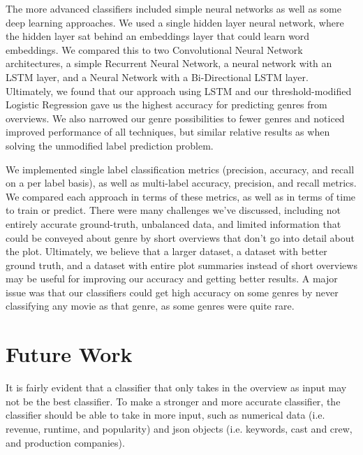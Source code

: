 \documentclass[sigconf]{acmart}
\begin{document}
The more advanced classifiers included simple neural networks as well as some deep learning approaches. We used a single hidden layer neural network, where the hidden layer sat behind an embeddings layer that could learn word embeddings.  We compared this to two Convolutional Neural Network architectures, a simple Recurrent Neural Network, a neural network with an LSTM layer, and a Neural Network with a Bi-Directional LSTM layer. Ultimately, we found that our approach using LSTM and our threshold-modified Logistic Regression gave us the highest accuracy for predicting genres from overviews. We also narrowed our genre possibilities to fewer genres and noticed improved performance of all techniques, but similar relative results as when solving the unmodified label prediction problem. 

We implemented single label classification metrics (precision, accuracy, and recall on a per label basis), as well as multi-label accuracy, precision, and recall metrics. We compared each approach in terms of these metrics, as well as in terms of time to train or predict. 
There were many challenges we've discussed, including not entirely accurate ground-truth, unbalanced data, and limited information that could be conveyed about genre by short overviews that don't go into detail about the plot. Ultimately, we believe that a larger dataset, a dataset with better ground truth, and a dataset with entire plot summaries instead of short overviews may be useful for improving our accuracy and getting better results. A major issue was that our classifiers could get high accuracy on some genres by never classifying any movie as that genre, as some genres were quite rare. 

\section{Future Work}
It is fairly evident that a classifier that only takes in the overview as input may not be the best classifier. To make a stronger and more accurate classifier, the classifier should be able to take in more input, such as numerical data (i.e. revenue, runtime, and popularity) and json objects (i.e. keywords, cast and crew, and production companies). 
\end{document}
